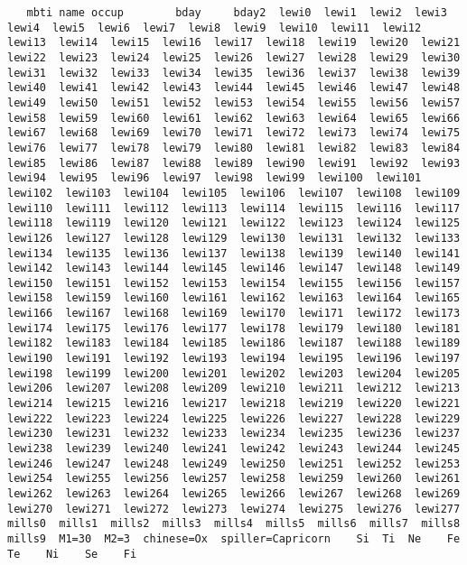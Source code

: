 \documentclass[12pt,fleqn]{article}\usepackage{../common}
\begin{document}
\begin{verbatim}
   mbti name occup        bday     bday2  lewi0  lewi1  lewi2  lewi3  lewi4  lewi5  lewi6  lewi7  lewi8  lewi9  lewi10  lewi11  lewi12  lewi13  lewi14  lewi15  lewi16  lewi17  lewi18  lewi19  lewi20  lewi21  lewi22  lewi23  lewi24  lewi25  lewi26  lewi27  lewi28  lewi29  lewi30  lewi31  lewi32  lewi33  lewi34  lewi35  lewi36  lewi37  lewi38  lewi39  lewi40  lewi41  lewi42  lewi43  lewi44  lewi45  lewi46  lewi47  lewi48  lewi49  lewi50  lewi51  lewi52  lewi53  lewi54  lewi55  lewi56  lewi57  lewi58  lewi59  lewi60  lewi61  lewi62  lewi63  lewi64  lewi65  lewi66  lewi67  lewi68  lewi69  lewi70  lewi71  lewi72  lewi73  lewi74  lewi75  lewi76  lewi77  lewi78  lewi79  lewi80  lewi81  lewi82  lewi83  lewi84  lewi85  lewi86  lewi87  lewi88  lewi89  lewi90  lewi91  lewi92  lewi93  lewi94  lewi95  lewi96  lewi97  lewi98  lewi99  lewi100  lewi101  lewi102  lewi103  lewi104  lewi105  lewi106  lewi107  lewi108  lewi109  lewi110  lewi111  lewi112  lewi113  lewi114  lewi115  lewi116  lewi117  lewi118  lewi119  lewi120  lewi121  lewi122  lewi123  lewi124  lewi125  lewi126  lewi127  lewi128  lewi129  lewi130  lewi131  lewi132  lewi133  lewi134  lewi135  lewi136  lewi137  lewi138  lewi139  lewi140  lewi141  lewi142  lewi143  lewi144  lewi145  lewi146  lewi147  lewi148  lewi149  lewi150  lewi151  lewi152  lewi153  lewi154  lewi155  lewi156  lewi157  lewi158  lewi159  lewi160  lewi161  lewi162  lewi163  lewi164  lewi165  lewi166  lewi167  lewi168  lewi169  lewi170  lewi171  lewi172  lewi173  lewi174  lewi175  lewi176  lewi177  lewi178  lewi179  lewi180  lewi181  lewi182  lewi183  lewi184  lewi185  lewi186  lewi187  lewi188  lewi189  lewi190  lewi191  lewi192  lewi193  lewi194  lewi195  lewi196  lewi197  lewi198  lewi199  lewi200  lewi201  lewi202  lewi203  lewi204  lewi205  lewi206  lewi207  lewi208  lewi209  lewi210  lewi211  lewi212  lewi213  lewi214  lewi215  lewi216  lewi217  lewi218  lewi219  lewi220  lewi221  lewi222  lewi223  lewi224  lewi225  lewi226  lewi227  lewi228  lewi229  lewi230  lewi231  lewi232  lewi233  lewi234  lewi235  lewi236  lewi237  lewi238  lewi239  lewi240  lewi241  lewi242  lewi243  lewi244  lewi245  lewi246  lewi247  lewi248  lewi249  lewi250  lewi251  lewi252  lewi253  lewi254  lewi255  lewi256  lewi257  lewi258  lewi259  lewi260  lewi261  lewi262  lewi263  lewi264  lewi265  lewi266  lewi267  lewi268  lewi269  lewi270  lewi271  lewi272  lewi273  lewi274  lewi275  lewi276  lewi277  mills0  mills1  mills2  mills3  mills4  mills5  mills6  mills7  mills8  mills9  M1=30  M2=3  chinese=Ox  spiller=Capricorn    Si  Ti  Ne    Fe    Te    Ni    Se    Fi

\end{verbatim}
\end{document}
